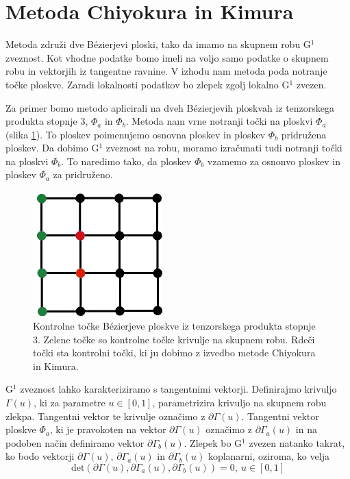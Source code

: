 \documentclass[a4paper,regno]{article}
\begin{document}
\section{Metoda Chiyokura in Kimura}
	Metoda združi dve Bézierjevi ploski, tako da imamo na skupnem robu G$^1$ zveznost.
	Kot vhodne podatke bomo imeli na voljo samo podatke o skupnem robu in vektorjih iz
	tangentne ravnine. V izhodu nam metoda poda notranje točke ploskve. Zaradi lokalnosti 
	podatkov bo zlepek zgolj lokalno G$^1$ zvezen.
	
	Za primer bomo metodo aplicirali na dveh Bézierjevih ploskvah iz tenzorskega produkta 
	stopnje 3, $\Phi_a$ in $\Phi_b$. Metoda nam vrne notranji točki na ploskvi 
	$\Phi_a$ (slika \ref{fig:domenski_kvadrat_chi_ki}). To ploskev poimenujemo osnovna 
	ploskev in ploskev $\Phi_b$ pridružena ploskev. Da dobimo G$^1$ zveznost na robu, 
	moramo izračunati tudi notranji točki na ploskvi $\Phi_b$. To naredimo tako, da ploskev 
	$\Phi_b$ vzamemo za osnonvo ploskev in ploskev $\Phi_a$ za pridruženo.

	\begin{figure}[h]
		\centering
		\includegraphics[width=5cm]{kvadratna_domena.jpg}
		\caption{Kontrolne točke Bézierjeve ploskve iz tenzorskega produkta stopnje 3. Zelene točke so
		kontrolne točke krivulje na skupnem robu. Rdeči točki 
		sta kontrolni točki, ki ju dobimo z izvedbo metode Chiyokura in Kimura.}
		\label{fig:domenski_kvadrat_chi_ki}
	\end{figure}

	G$^1$ zveznost lahko karakteriziramo s tangentnimi vektorji.
	Definirajmo krivuljo $\Gamma(u)$, ki za parametre $u \in [0, 1]$, parametrizira 
	krivuljo na skupnem robu zlekpa. Tangentni vektor te krivulje označimo z 
	$\partial \Gamma(u)$. Tangentni vektor ploskve $\Phi_a$, ki je pravokoten na vektor
	$\partial \Gamma(u)$ označimo z $\partial \Gamma_a(u)$ in na podoben način definiramo
	vektor $\partial \Gamma_b(u)$. Zlepek bo G$^1$ zvezen natanko takrat, ko bodo 
	vektorji $\partial \Gamma(u)$, $\partial \Gamma_a(u)$ in $\partial \Gamma_b(u)$
	koplanarni, oziroma, ko velja 
	\begin{equation}
		\label{eq:det}
		\text{det} (\partial \Gamma(u), \partial \Gamma_a(u), \partial \Gamma_b(u)) = 0, \ u \in [0, 1]
	\end{equation}
	
\end{document}
